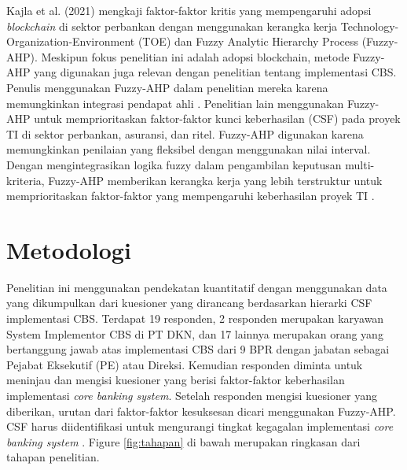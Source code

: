 \documentclass[journal,article,submit,pdftex,moreauthors]{Definitions/mdpi}
\begin{document}
Kajla et al. (2021) mengkaji faktor-faktor kritis yang mempengaruhi adopsi \textit{blockchain} di sektor perbankan dengan menggunakan kerangka kerja Technology-Organization-Environment (TOE) dan Fuzzy Analytic Hierarchy Process (Fuzzy-AHP). Meskipun fokus penelitian ini adalah adopsi blockchain, metode Fuzzy-AHP yang digunakan juga relevan dengan penelitian tentang implementasi CBS. Penulis menggunakan Fuzzy-AHP dalam penelitian mereka karena memungkinkan integrasi pendapat ahli \cite{KajlaFAHP}. Penelitian lain menggunakan Fuzzy-AHP untuk memprioritaskan faktor-faktor kunci keberhasilan (CSF) pada proyek TI di sektor perbankan, asuransi, dan ritel. Fuzzy-AHP digunakan karena memungkinkan penilaian yang fleksibel dengan menggunakan nilai interval. Dengan mengintegrasikan logika fuzzy dalam pengambilan keputusan multi-kriteria, Fuzzy-AHP memberikan kerangka kerja yang lebih terstruktur untuk memprioritaskan faktor-faktor yang mempengaruhi keberhasilan proyek TI \cite{Siddique-fahp}.


\section{Metodologi}
Penelitian ini menggunakan pendekatan kuantitatif dengan menggunakan data yang dikumpulkan dari kuesioner yang dirancang berdasarkan hierarki CSF implementasi CBS. Terdapat 19 responden, 2 responden merupakan karyawan System Implementor CBS di PT DKN, dan 17 lainnya merupakan orang yang bertanggung jawab atas implementasi CBS dari 9 BPR dengan jabatan sebagai Pejabat Eksekutif (PE) atau Direksi. Kemudian responden diminta untuk meninjau dan mengisi kuesioner yang berisi faktor-faktor keberhasilan implementasi \textit{core banking system}. Setelah responden mengisi kuesioner yang diberikan, urutan dari faktor-faktor kesuksesan dicari menggunakan Fuzzy-AHP. CSF harus diidentifikasi untuk mengurangi tingkat kegagalan implementasi \textit{core banking system} \cite{aggestam2023apply}. Figure \ref{fig:tahapan} di bawah merupakan ringkasan dari tahapan penelitian.

\end{document}
